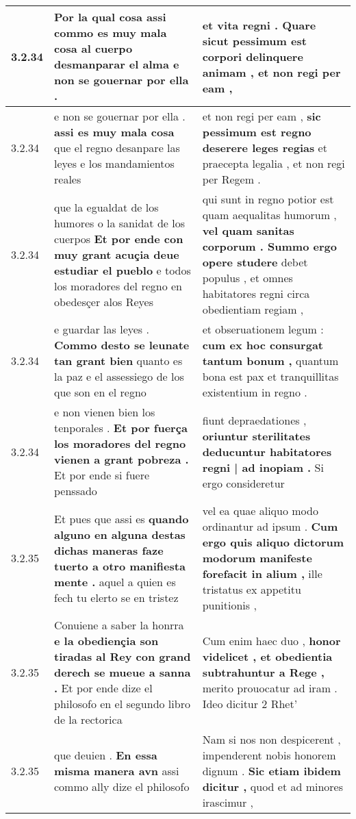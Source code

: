 \begin{tabular}{|p{1cm}|p{6.5cm}|p{6.5cm}|}
3.2.34 & Por la qual cosa \textbf{ assi commo es muy mala cosa al cuerpo desmanparar el alma } e non se gouernar por ella . & et vita regni . \textbf{ Quare sicut pessimum est corpori delinquere animam , } et non regi per eam , \\\hline
3.2.34 & e non se gouernar por ella . \textbf{ assi es muy mala cosa } que el regno desanpare las leyes e los mandamientos reales & et non regi per eam , \textbf{ sic pessimum est regno deserere leges regias } et praecepta legalia , et non regi per Regem . \\\hline
3.2.34 & que la egualdat de los humores o la sanidat de los cuerpos \textbf{ Et por ende con muy grant acuçia deue estudiar el pueblo } e todos los moradores del regno en obedesçer alos Reyes & qui sunt in regno potior est quam aequalitas humorum , \textbf{ vel quam sanitas corporum . Summo ergo opere studere } debet populus , et omnes habitatores regni circa obedientiam regiam , \\\hline
3.2.34 & e guardar las leyes . \textbf{ Commo desto se leunate tan grant bien } quanto es la paz e el assessiego de los que son en el regno & et obseruationem legum : \textbf{ cum ex hoc consurgat tantum bonum , } quantum bona est pax et tranquillitas existentium in regno . \\\hline
3.2.34 & e non vienen bien los tenporales . \textbf{ Et por fuerça los moradores del regno vienen a grant pobreza . } Et por ende si fuere penssado & fiunt depraedationes , \textbf{ oriuntur sterilitates deducuntur habitatores regni | ad inopiam . } Si ergo consideretur \\\hline
3.2.35 & Et pues que assi es \textbf{ quando alguno en alguna destas dichas maneras faze tuerto a otro manifiesta mente . } aquel a quien es fech tu elerto se en tristez & vel ea quae aliquo modo ordinantur ad ipsum . \textbf{ Cum ergo quis aliquo dictorum modorum manifeste forefacit in alium , } ille tristatus ex appetitu punitionis , \\\hline
3.2.35 & Conuiene a saber la honrra \textbf{ e la obediençia son tiradas al Rey con grand derech se mueue a sanna . } Et por ende dize el philosofo en el segundo libro de la rectorica & Cum enim haec duo , \textbf{ honor videlicet , et obedientia subtrahuntur a Rege , } merito prouocatur ad iram . Ideo dicitur 2 Rhet’ \\\hline
3.2.35 & que deuien . \textbf{ En essa misma manera avn } assi commo ally dize el philosofo & Nam si nos non despicerent , impenderent nobis honorem dignum . \textbf{ Sic etiam ibidem dicitur , } quod et ad minores irascimur , \\\hline

\end{tabular}
